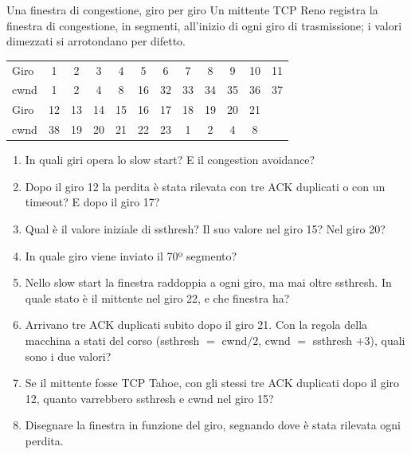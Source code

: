 \begin{esercizio}{Una finestra di congestione, giro per giro}
Un mittente TCP Reno registra la finestra di congestione, in segmenti, all'inizio di ogni giro di trasmissione; i valori dimezzati si
arrotondano per difetto.
\begin{center}
\small
\begin{tabular}{l*{11}{c}}
\toprule
Giro & 1 & 2 & 3 & 4 & 5 & 6 & 7 & 8 & 9 & 10 & 11 \\
cwnd & 1 & 2 & 4 & 8 & 16 & 32 & 33 & 34 & 35 & 36 & 37 \\
\midrule
Giro & 12 & 13 & 14 & 15 & 16 & 17 & 18 & 19 & 20 & 21 & \\
cwnd & 38 & 19 & 20 & 21 & 22 & 23 & 1 & 2 & 4 & 8 & \\
\bottomrule
\end{tabular}
\end{center}
\begin{enumerate}[label=(\alph*)]
    \item In quali giri opera lo slow start? E il congestion avoidance?
    \item Dopo il giro 12 la perdita è stata rilevata con tre ACK duplicati o con un timeout? E dopo il giro 17?
    \item Qual è il valore iniziale di ssthresh? Il suo valore nel giro 15? Nel giro 20?
    \item In quale giro viene inviato il 70º segmento?
    \item Nello slow start la finestra raddoppia a ogni giro, ma mai oltre ssthresh. In quale stato è il mittente nel giro 22, e che finestra
          ha?
    \item Arrivano tre ACK duplicati subito dopo il giro 21. Con la regola della macchina a stati del corso (ssthresh $=$ cwnd$/2$, cwnd $=$
          ssthresh $+ 3$), quali sono i due valori?
    \item Se il mittente fosse TCP Tahoe, con gli stessi tre ACK duplicati dopo il giro 12, quanto varrebbero ssthresh e cwnd nel giro 15?
    \item Disegnare la finestra in funzione del giro, segnando dove è stata rilevata ogni perdita.
\end{enumerate}


\end{esercizio}
